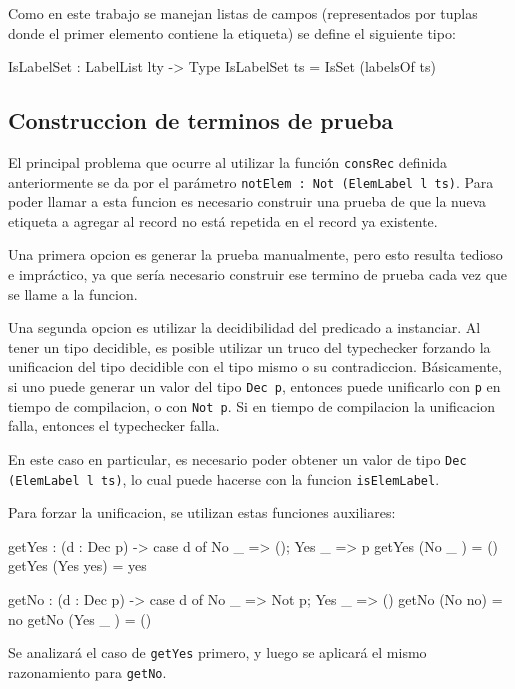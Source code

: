 Como en este trabajo se manejan listas de campos (representados por tuplas donde el primer elemento contiene la etiqueta) se define el siguiente tipo:

\begin{code}
IsLabelSet : LabelList lty -> Type
IsLabelSet ts = IsSet (labelsOf ts)  
\end{code}

\subsection{Construccion de terminos de prueba}

El principal problema que ocurre al utilizar la función \texttt{consRec} definida anteriormente se da por el parámetro \texttt{notElem : Not (ElemLabel l ts)}. Para poder llamar a esta funcion es necesario construir una prueba de que la nueva etiqueta a agregar al record no está repetida en el record ya existente.

Una primera opcion es generar la prueba manualmente, pero esto resulta tedioso e impráctico, ya que sería necesario construir ese termino de prueba cada vez que se llame a la funcion.

Una segunda opcion es utilizar la decidibilidad del predicado a instanciar. Al tener un tipo decidible, es posible utilizar un truco del typechecker forzando la unificacion del tipo decidible con el tipo mismo o su contradiccion.
Básicamente, si uno puede generar un valor del tipo \texttt{Dec p}, entonces puede unificarlo con \texttt{p} en tiempo de compilacion, o con \texttt{Not p}. Si en tiempo de compilacion la unificacion falla, entonces el typechecker falla.

En este caso en particular, es necesario poder obtener un valor de tipo \texttt{Dec (ElemLabel l ts)}, lo cual puede hacerse con la funcion \texttt{isElemLabel}.

Para forzar la unificacion, se utilizan estas funciones auxiliares:

\begin{code}
getYes : (d : Dec p) -> 
  case d of { No _ => (); Yes _ => p}
getYes (No _ ) = ()
getYes (Yes yes) = yes

getNo : (d : Dec p) -> 
  case d of { No _ => Not p; Yes _ => ()}
getNo (No no) = no
getNo (Yes _ ) = ()
\end{code}

Se analizará el caso de \texttt{getYes} primero, y luego se aplicará el mismo razonamiento para \texttt{getNo}.

